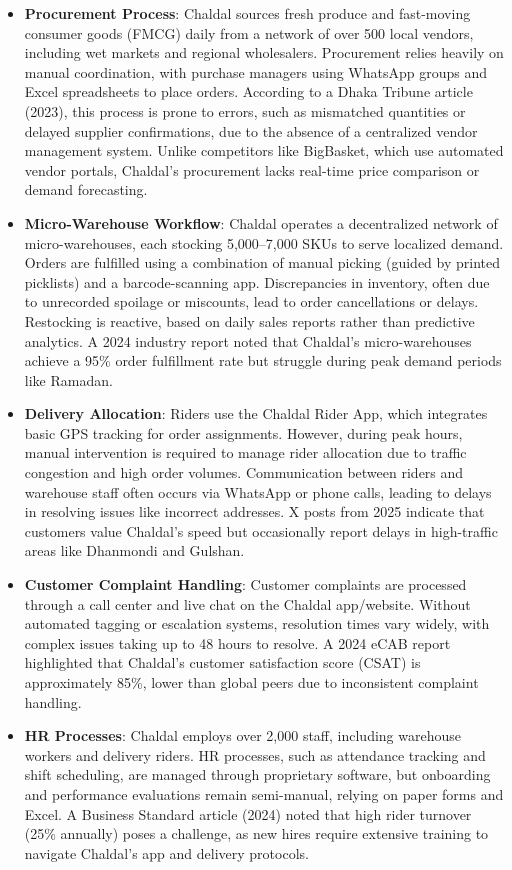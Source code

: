 \documentclass[12pt,a4paper]{article}
\begin{document}
\begin{itemize}
    \item \textbf{Procurement Process}: Chaldal sources fresh produce and fast-moving consumer goods (FMCG) daily from a network of over 500 local vendors, including wet markets and regional wholesalers. Procurement relies heavily on manual coordination, with purchase managers using WhatsApp groups and Excel spreadsheets to place orders. According to a Dhaka Tribune article (2023), this process is prone to errors, such as mismatched quantities or delayed supplier confirmations, due to the absence of a centralized vendor management system. Unlike competitors like BigBasket, which use automated vendor portals, Chaldal’s procurement lacks real-time price comparison or demand forecasting.
    
    \item \textbf{Micro-Warehouse Workflow}: Chaldal operates a decentralized network of micro-warehouses, each stocking 5,000–7,000 SKUs to serve localized demand. Orders are fulfilled using a combination of manual picking (guided by printed picklists) and a barcode-scanning app. Discrepancies in inventory, often due to unrecorded spoilage or miscounts, lead to order cancellations or delays. Restocking is reactive, based on daily sales reports rather than predictive analytics. A 2024 industry report noted that Chaldal’s micro-warehouses achieve a 95\% order fulfillment rate but struggle during peak demand periods like Ramadan.
    
    \item \textbf{Delivery Allocation}: Riders use the Chaldal Rider App, which integrates basic GPS tracking for order assignments. However, during peak hours, manual intervention is required to manage rider allocation due to traffic congestion and high order volumes. Communication between riders and warehouse staff often occurs via WhatsApp or phone calls, leading to delays in resolving issues like incorrect addresses. X posts from 2025 indicate that customers value Chaldal’s speed but occasionally report delays in high-traffic areas like Dhanmondi and Gulshan.
    
    \item \textbf{Customer Complaint Handling}: Customer complaints are processed through a call center and live chat on the Chaldal app/website. Without automated tagging or escalation systems, resolution times vary widely, with complex issues taking up to 48 hours to resolve. A 2024 eCAB report highlighted that Chaldal’s customer satisfaction score (CSAT) is approximately 85\%, lower than global peers due to inconsistent complaint handling.
    
    \item \textbf{HR Processes}: Chaldal employs over 2,000 staff, including warehouse workers and delivery riders. HR processes, such as attendance tracking and shift scheduling, are managed through proprietary software, but onboarding and performance evaluations remain semi-manual, relying on paper forms and Excel. A Business Standard article (2024) noted that high rider turnover (25\% annually) poses a challenge, as new hires require extensive training to navigate Chaldal’s app and delivery protocols. 
\end{itemize}
\end{document}
